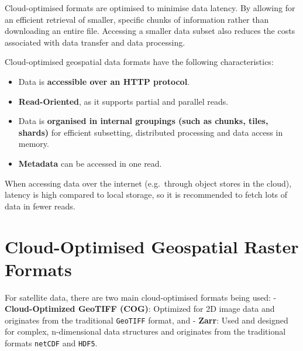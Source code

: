 \documentclass[
  letterpaper,
  DIV=11,
  numbers=noendperiod]{scrreprt}
\providecommand{\tightlist}{%
  \setlength{\itemsep}{0pt}\setlength{\parskip}{0pt}}
\begin{document}
Cloud-optimised formats are optimised to minimise data latency. By
allowing for an efficient retrieval of smaller, specific chunks of
information rather than downloading an entire file. Accessing a smaller
data subset also reduces the costs associated with data transfer and
data processing.

Cloud-optimised geospatial data formats have the following
characteristics:

\begin{itemize}
\tightlist
\item
  Data is \textbf{accessible over an HTTP protocol}.
\item
  \textbf{Read-Oriented}, as it supports partial and parallel reads.
\item
  Data is \textbf{organised in internal groupings (such as chunks,
  tiles, shards)} for efficient subsetting, distributed processing and
  data access in memory.
\item
  \textbf{Metadata} can be accessed in one read.
\end{itemize}

\begin{tcolorbox}[enhanced jigsaw, coltitle=black, colback=white, leftrule=.75mm, colbacktitle=quarto-callout-note-color!10!white, titlerule=0mm, title=\textcolor{quarto-callout-note-color}{\faInfo}\hspace{0.5em}{Note}, rightrule=.15mm, bottomrule=.15mm, bottomtitle=1mm, toptitle=1mm, arc=.35mm, toprule=.15mm, left=2mm, opacityback=0, colframe=quarto-callout-note-color-frame, opacitybacktitle=0.6, breakable]

When accessing data over the internet (e.g.~through object stores in the
cloud), latency is high compared to local storage, so it is recommended
to fetch lots of data in fewer reads.

\end{tcolorbox}

\section{Cloud-Optimised Geospatial Raster
Formats}\label{cloud-optimised-geospatial-raster-formats}

For satellite data, there are two main cloud-optimised formats being
used: - \textbf{Cloud-Optimized GeoTIFF (COG)}: Optimized for 2D image
data and originates from the traditional \texttt{GeoTIFF} format, and -
\textbf{Zarr}: Used and designed for complex, n-dimensional data
structures and originates from the traditional formats \texttt{netCDF}
and \texttt{HDF5}.
\end{document}
